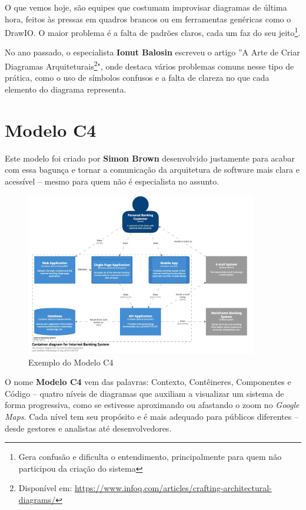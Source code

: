 \documentclass[a4paper,11pt]{article}
\begin{document}
O que vemos hoje, são equipes que costumam improvisar diagramas de última hora, feitos às pressas em quadros brancos ou em ferramentas genéricas como o DrawIO\cite{drawio}. O maior problema é a falta de padrões claros, cada um faz do seu jeito\footnote{Gera confusão e dificulta o entendimento, principalmente para quem não participou da criação do sistema}.

No ano passado, o especialista \textbf{Ionut Balosin} escreveu o artigo ”A Arte de Criar Diagramas Arquiteturais\footnote{Disponível em: \url{https://www.infoq.com/articles/crafting-architectural-diagrams/}}", onde destaca vários problemas comuns nesse tipo de prática, como o uso de símbolos confusos e a falta de clareza no que cada elemento do diagrama representa.

\section{Modelo C4}
Este modelo foi criado por \textbf{Simon Brown} desenvolvido justamente para acabar com essa bagunça e tornar a comunicação da arquitetura de software mais clara e acessível -- mesmo para quem não é especialista no assunto.

\begin{figure}[!htb]
	\centering
	\includegraphics[width=0.9\textwidth]{imagens/ModeloC4}
	\caption{Exemplo do Modelo C4}
\end{figure}

O nome \textbf{Modelo C4} vem das palavras: Contexto, Contêineres, Componentes e Código -- quatro níveis de diagramas que auxiliam a visualizar um sistema de forma progressiva, como se estivesse aproximando ou afastando o zoom no \textit{Google Maps}. Cada nível tem seu propósito e é mais adequado para públicos diferentes – desde gestores e analistas até desenvolvedores.
\end{document}
